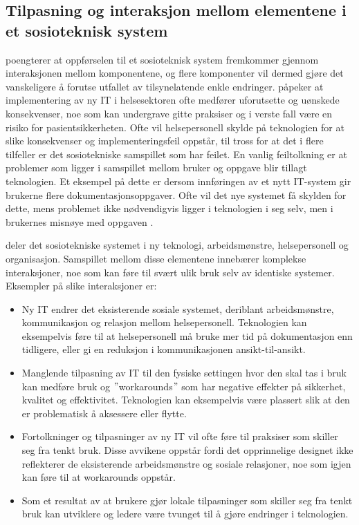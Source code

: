 \subsection{Tilpasning og interaksjon mellom elementene i et sosioteknisk system}
\label{sec:tilpasning}
\citet{Coiera04} poengterer at oppførselen til et sosioteknisk system fremkommer gjennom interaksjonen mellom komponentene, og flere komponenter vil dermed gjøre det vanskeligere å forutse utfallet av tilsynelatende enkle endringer. \citet{Harrison} påpeker at implementering av ny IT i helsesektoren ofte medfører uforutsette og uønskede konsekvenser, noe som kan undergrave gitte praksiser og i verste fall være en risiko for pasientsikkerheten. Ofte vil helsepersonell skylde på teknologien for at slike konsekvenser og implementeringsfeil oppstår, til tross for at det i flere tilfeller er det sosiotekniske samspillet som har feilet. En vanlig feiltolkning er at problemer som ligger i samspillet mellom bruker og oppgave blir tillagt teknologien. Et eksempel på dette er dersom innføringen av et nytt IT-system gir brukerne flere dokumentasjonsoppgaver. Ofte vil det nye systemet få skylden for dette, mens problemet ikke nødvendigvis ligger i teknologien i seg selv, men i brukernes misnøye med oppgaven \citep{FITT}.

\noindent
\citet{Harrison} deler det sosiotekniske systemet i ny teknologi, arbeidsmønstre, helsepersonell og organisasjon. Samspillet mellom disse elementene innebærer komplekse interaksjoner, noe som kan føre til svært ulik bruk selv av identiske systemer. Eksempler på slike interaksjoner er:

\begin{itemize}
\item Ny IT endrer det eksisterende sosiale systemet, deriblant arbeidsmønstre, kommunikasjon og relasjon mellom helsepersonell. Teknologien kan eksempelvis føre til at helsepersonell må bruke mer tid på dokumentasjon enn tidligere, eller gi en reduksjon i kommunikasjonen ansikt-til-ansikt.
\item Manglende tilpasning av IT til den fysiske settingen hvor den skal tas i bruk kan medføre bruk og $"$workarounds$"$ som har negative effekter på sikkerhet, kvalitet og effektivitet. Teknologien kan eksempelvis være plassert slik at den er problematisk å aksessere eller flytte.
\item Fortolkninger og tilpasninger av ny IT vil ofte føre til praksiser som skiller seg fra tenkt bruk. Disse avvikene oppstår fordi det opprinnelige designet ikke reflekterer de eksisterende arbeidsmønstre og sosiale relasjoner, noe som igjen kan føre til at workarounds oppstår. 
\item Som et resultat av at brukere gjør lokale tilpasninger som skiller seg fra tenkt bruk kan utviklere og ledere være tvunget til å gjøre endringer i teknologien.
\end{itemize} 

